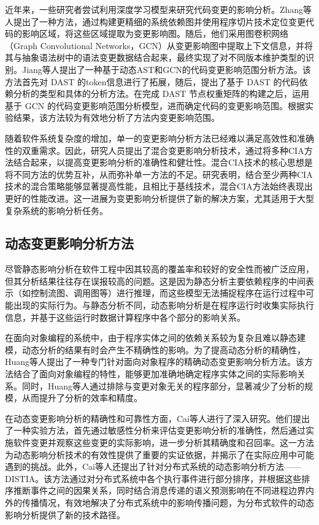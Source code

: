 近年来，一些研究者尝试利用深度学习模型来研究代码变更的影响分析。Zhang等人\cite{10366673}提出了一种方法，通过构建更精细的系统依赖图并使用程序切片技术定位变更代码的影响区域，将这些区域提取为变更影响图。随后，他们采用图卷积网络（Graph Convolutional Networks，GCN）从变更影响图中提取上下文信息，并将其与抽象语法树中的语法变更数据结合起来，最终实现了对不同版本维护类型的识别。Jiang等人\cite{姜瑛2024基于动态}提出了一种基于动态AST和GCN的代码变更影响范围分析方法。该方法首先对 DAST 的token信息进行了拓展，随后，提出了基于 DAST 的代码依赖分析的类型和具体的分析方法。在完成 DAST 节点权重矩阵的构建之后，运用基于 GCN 的代码变更影响范围分析模型，进而确定代码的变更影响范围。根据实验结果，该方法较为有效地分析了方法内变更影响范围。

随着软件系统复杂度的增加，单一的变更影响分析方法已经难以满足高效性和准确性的双重需求。因此，研究人员提出了混合变更影响分析技术，通过将多种CIA方法结合起来，以提高变更影响分析的准确性和健壮性\cite{2021Improving}。混合CIA技术的核心思想是将不同方法的优势互补，从而弥补单一方法的不足。研究表明，结合至少两种CIA技术的混合策略能够显著提高性能，且相比于基线技术，混合CIA方法始终表现出更好的性能改进。这一进展为变更影响分析提供了新的解决方案，尤其适用于大型复杂系统的影响分析任务。


\subsection{动态变更影响分析方法}

尽管静态影响分析在软件工程中因其较高的覆盖率和较好的安全性而被广泛应用，但其分析结果往往存在误报较高的问题。这是因为静态分析主要依赖程序的中间表示（如控制流图、调用图等）进行推理，而这些模型无法捕捉程序在运行过程中可能出现的实际行为。与静态分析不同，动态影响分析是在程序运行时收集实际执行信息，并基于这些运行时数据计算程序中各个部分的影响关系。

在面向对象编程的系统中，由于程序实体之间的依赖关系较为复杂且难以静态建模，动态分析的结果有时会产生不精确性的影响。为了提高动态分析的精确性，Huang等人\cite{2007Precise}提出了一种专门针对面向对象程序的精确动态变更影响分析方法。该方法结合了面向对象编程的特性，能够更加准确地确定程序实体之间的实际影响关系。同时，Huang等人通过排除与变更对象无关的程序部分，显著减少了分析的规模，从而提升了分析的效率和精度。

在动态变更影响分析的精确性和可靠性方面，Cai等人\cite{2015Acom,2014Estimating}进行了深入研究。他们提出了一种实验方法，首先通过敏感性分析来评估变更影响分析的准确性，然后通过实施软件变更并观察这些变更的实际影响，进一步分析其精确度和召回率。这一方法为动态影响分析技术的有效性提供了重要的实证依据，并揭示了在实际应用中可能遇到的挑战。此外，Cai等人还提出了针对分布式系统的动态影响分析方法——DISTIA\cite{2016DistIA}。该方法通过对分布式系统中各个执行事件进行部分排序，并根据这些排序推断事件之间的因果关系，同时结合消息传递的语义预测影响在不同进程边界内外的传播情况，有效地解决了分布式系统中的影响传播问题，为分布式软件的动态影响分析提供了新的技术路径。

